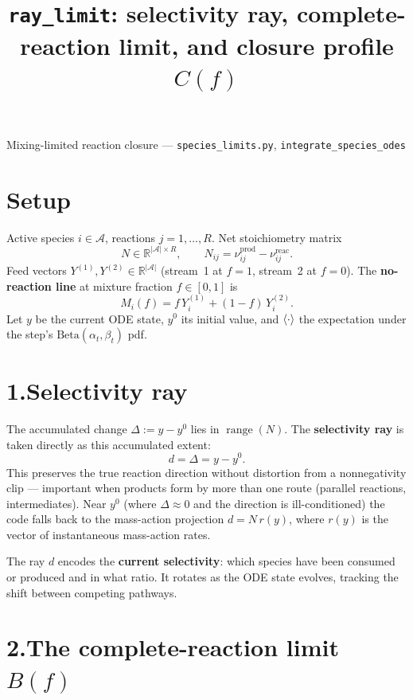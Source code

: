 \documentclass[11pt]{article}
\title{\vspace{-1.5em}\textbf{\large \texttt{ray\_limit}: selectivity ray,
complete-reaction limit, and closure profile \(C(f)\)}}
\author{}
\date{}
\newcommand{\reac}{\mathrm{reac}}
\newcommand{\prodsup}{\mathrm{prod}}
\newcommand{\code}[1]{\texttt{\small #1}}
\DeclarePairedDelimiter{\avg}{\langle}{\rangle}
\begin{document}
\maketitle
\vspace{-3.5em}
\begin{center}
\textcolor{gray!70!black}{\small Mixing-limited reaction closure \quad---\quad
\code{species\_limits.py}, \code{integrate\_species\_odes}}
\end{center}
\vspace{0.4em}

\section*{Setup}

Active species \(i\in\mathcal{A}\), reactions \(j=1,\dots,R\). Net stoichiometry matrix
\[
N\in\mathbb{R}^{|\mathcal{A}|\times R},\qquad
N_{ij}=\nu^{\prodsup}_{ij}-\nu^{\reac}_{ij}.
\]
Feed vectors \(Y^{(1)},Y^{(2)}\in\mathbb{R}^{|\mathcal{A}|}\) (stream~1 at \(f=1\),
stream~2 at \(f=0\)). The \textbf{no-reaction line} at mixture fraction \(f\in[0,1]\) is
\[
M_i(f)=f\,Y^{(1)}_i+(1-f)\,Y^{(2)}_i.
\]
Let \(y\) be the current ODE state, \(y^0\) its initial value, and \(\avg{\cdot}\) the
expectation under the step's \(\mathrm{Beta}(\alpha_t,\beta_t)\) pdf.

\section*{1.\quad Selectivity ray}

The accumulated change \(\Delta:=y-y^0\) lies in \(\operatorname{range}(N)\). The
\textbf{selectivity ray} is taken directly as this accumulated extent:
\[
d = \Delta = y - y^0.
\]
This preserves the true reaction direction without distortion from a nonnegativity clip
--- important when products form by more than one route (parallel reactions,
intermediates). Near \(y^0\) (where \(\Delta\approx 0\) and the direction is
ill-conditioned) the code falls back to the mass-action projection
\(d = N\,r(y)\), where \(r(y)\) is the vector of instantaneous mass-action rates.

The ray \(d\) encodes the \textbf{current selectivity}: which species have been consumed
or produced and in what ratio. It rotates as the ODE state evolves, tracking the shift
between competing pathways.

\section*{2.\quad The complete-reaction limit \(B(f)\)}
\end{document}

